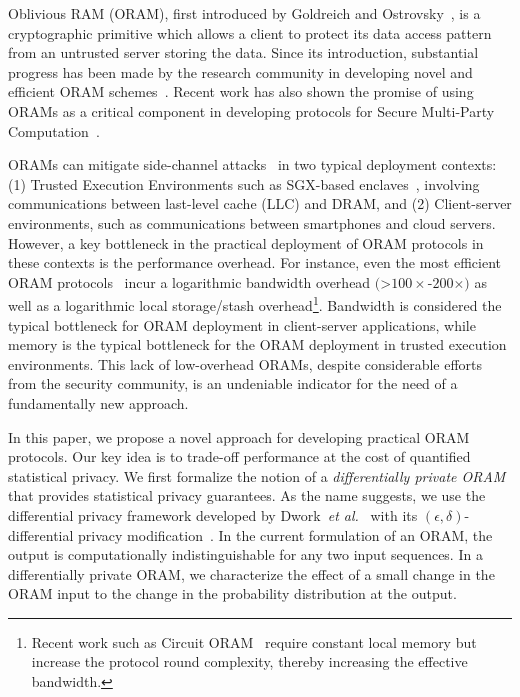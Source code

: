 \documentclass[USenglish,oneside,twocolumn]{article}
\makeatletter
\let\origsection\section
\renewcommand\section{\@ifstar{\starsection}{\nostarsection}}
\newcommand\nostarsection[1]
{\sectionprelude\origsection{#1}\sectionpostlude}
\newcommand\starsection[1]
{\sectionprelude\origsection*{#1}\sectionpostlude}
\newcommand\sectionprelude{\vspace{-1em}
}
\newcommand\sectionpostlude{\vspace{-1em}
}
\makeatother
\begin{document}
\vspace{-3.5em}
\section{Introduction}\label{sec:introduction}

Oblivious RAM (ORAM), first introduced by Goldreich 
and Ostrovsky~\cite{goldreichoram, goldreich1987towards}, 
is a cryptographic primitive which allows a client to 
protect its data access pattern from an untrusted server 
storing the data. Since its introduction, substantial 
progress has been made by the research community in 
developing novel and efficient 
ORAM schemes~\cite{pathoram,ringoram,gentryoramSC,burstoram,oblivistore, SokDatabaseSearch, tree_based_orams, ren2013design}. 
Recent work has also shown the promise of using ORAMs as a 
critical component in developing protocols for 
Secure Multi-Party Computation~\cite{gentryoramSC}.

ORAMs can mitigate side-channel attacks~\cite{accesspatterndisclosure,dautrich2013compromising} in two typical deployment contexts:
(1) Trusted Execution Environments such as SGX-based enclaves~\cite{sgxreference}, involving communications between last-level cache (LLC) and DRAM, and 
(2) Client-server environments, such as communications between smartphones and cloud servers. However, a key bottleneck in 
the practical deployment of ORAM protocols in these contexts is the performance overhead.  
For instance, even the most efficient ORAM protocols~\cite{ringoram,pathoram,burstoram,SSSoram} incur a 
logarithmic bandwidth overhead $($>$100 \times$-$200 \times)$ as well as a logarithmic local storage/stash overhead\footnote{Recent work such as Circuit ORAM~\cite{circuitoram} require constant local memory but increase the protocol round complexity, thereby increasing the effective bandwidth.}. 
Bandwidth is considered the typical bottleneck for ORAM deployment in client-server applications, 
while memory is the typical bottleneck for the ORAM deployment in trusted execution environments. 
This lack of low-overhead ORAMs, despite considerable efforts from the security community, 
is an undeniable indicator for the need of a fundamentally new approach.

In this paper, we propose a novel approach for developing practical
ORAM protocols. Our key idea is to trade-off performance at the cost 
of quantified statistical privacy. We first formalize the notion 
of a \emph{differentially private ORAM} that provides statistical privacy 
guarantees. As the name suggests, we use the differential privacy framework 
developed by Dwork~\textit{et al.}~\cite{differentialprivacy} with its $(\epsilon,\delta)$-differential 
privacy modification~\cite{epsilondelta}. 
In the current formulation of an ORAM, the output is computationally indistinguishable for any two input sequences.
In a differentially private ORAM, we characterize the effect of a small 
change in the ORAM input to the change in the probability distribution at the output.
\end{document}
